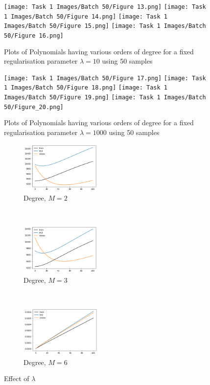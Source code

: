 \begin{figure}[p]
   \texttt{[image: Task 1 Images/Batch 50/Figure 13.png]}\hfill
    \texttt{[image: Task 1 Images/Batch 50/Figure 14.png]}\hfill
    \texttt{[image: Task 1 Images/Batch 50/Figure 15.png]}\hfill
    \texttt{[image: Task 1 Images/Batch 50/Figure 16.png]}
    \caption{Plots of Polynomials having various orders of degree for a fixed regularisation parameter $\lambda = 10$ using 50 samples}
    \label{fig:9}
    \vspace*{\floatsep}

    \texttt{[image: Task 1 Images/Batch 50/Figure 17.png]}\hfill
    \texttt{[image: Task 1 Images/Batch 50/Figure 18.png]}\hfill
    \texttt{[image: Task 1 Images/Batch 50/Figure 19.png]}\hfill
    \texttt{[image: Task 1 Images/Batch 50/Figure\_20.png]}
    \caption{Plots of Polynomials having various orders of degree for a fixed regularisation parameter $\lambda = 1000$ using 50 samples}
    \label{fig:10}
    \vspace*{\floatsep}
\end{figure}
\newpage
\begin{figure}[b]
    \centering
    \begin{subfigure}[t]{0.25\textwidth}
        \centering
        \includegraphics[height=1in]{Task 2 Images/batch500_deg2_lambda.png}
        \caption{Degree, $M = 2$}
    \end{subfigure}%
    ~ 
    \begin{subfigure}[t]{0.25\textwidth}
        \centering
        \includegraphics[height=1in]{Task 2 Images/batch500_deg3_lambda.png}
        \caption{Degree, $M = 3$ }
    \end{subfigure}%
    ~
    \begin{subfigure}[t]{0.25\textwidth}
        \centering
        \includegraphics[height=1in]{Task 2 Images/batch500_deg6_lambda1to100.png}
        \caption{ Degree, $M = 6$}
    \end{subfigure}
    \caption{Effect of $\lambda$}
    \label{fig:11}
\end{figure}

